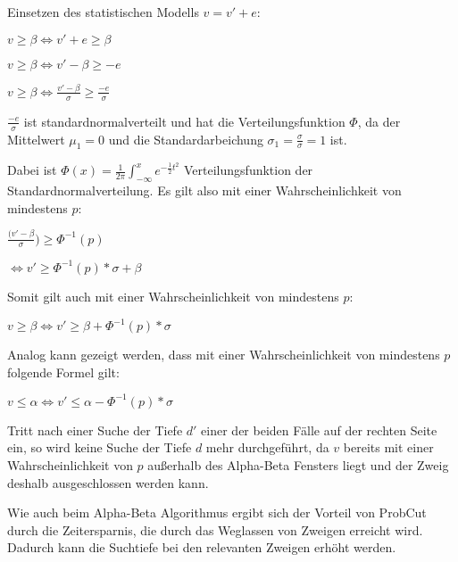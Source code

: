 Einsetzen des statistischen Modells $v=v'+e$:

\hspace*{1.3cm}
$v\geq\beta\iff v'+e\geq\beta$

\hspace*{1.3cm}
$v\geq\beta\iff v'-\beta\geq -e$

\hspace*{1.3cm}
$v\geq\beta\iff \frac{v'-\beta}{\sigma}\geq \frac{-e}{\sigma}$

$\frac{-e}{\sigma}$ ist standardnormalverteilt und hat die Verteilungsfunktion $\Phi$, da der Mittelwert $\mu_1=0$ und
die Standardarbeichung $\sigma_1=\frac{\sigma}{\sigma}=1$ ist.

Dabei ist $\Phi(x)=\frac{1}{2\pi}\int_{-\infty}^xe^{-\frac{1}{2}t^2}$ Verteilungsfunktion der Standardnormalverteilung.
Es gilt also mit einer Wahrscheinlichkeit von mindestens $p$:

\hspace*{1.3cm}
$\frac{(v'-\beta}{\sigma})\geq\Phi^{-1}(p)$

\hspace*{1.3cm}
$\iff v'\geq\Phi^{-1}(p)*\sigma+\beta$

Somit gilt auch mit einer Wahrscheinlichkeit von mindestens $p$:

\hspace*{1.3cm}
\(v\geq\beta \iff v'\geq\beta+\Phi^{-1}(p)*\sigma\)

Analog kann gezeigt werden, dass mit einer Wahrscheinlichkeit von mindestens $p$ folgende Formel gilt:

\hspace*{1.3cm}
\(v\leq\alpha \iff v'\leq\alpha-\Phi^{-1}(p)*\sigma\)


Tritt nach einer Suche der Tiefe \(d'\) einer der beiden Fälle auf der rechten Seite ein, so wird keine Suche der Tiefe
\(d\) mehr durchgeführt, da \(v\) bereits mit einer Wahrscheinlichkeit von \(p\) außerhalb des Alpha-Beta Fensters liegt
und der Zweig deshalb ausgeschlossen werden kann.

Wie auch beim Alpha-Beta Algorithmus ergibt sich der Vorteil von ProbCut durch die Zeitersparnis, die durch das
Weglassen von Zweigen erreicht wird. Dadurch kann die Suchtiefe bei den relevanten Zweigen erhöht werden.
\cite[S.~1]{probcut}
